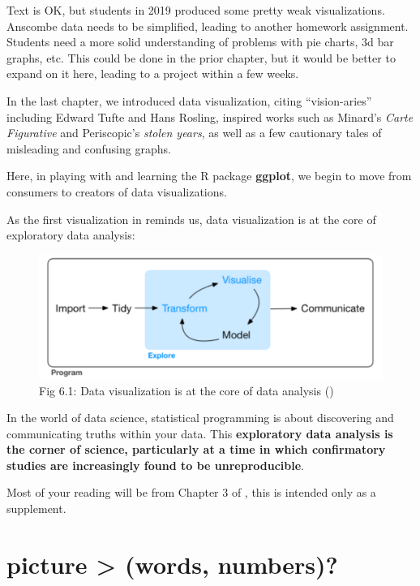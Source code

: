 \documentclass[
  openany]{book}
\begin{document}
Text is OK, but students in 2019 produced some pretty weak visualizations. Anscombe data needs to be simplified, leading to another homework assignment. Students need a more solid understanding of problems with pie charts, 3d bar graphs, etc. This could be done in the prior chapter, but it would be better to expand on it here, leading to a project within a few weeks.

In the last chapter, we introduced data visualization, citing ``vision-aries'' including Edward Tufte and Hans Rosling, inspired works such as Minard's \emph{Carte Figurative} and Periscopic's \emph{stolen years}, as well as a few cautionary tales of misleading and confusing graphs.

Here, in playing with and learning the R package \textbf{ggplot}, we begin to move from consumers to creators of data visualizations.

As the first visualization in \citet{wickham2016r} reminds us, data visualization is at the core of exploratory data analysis:

\begin{figure}
\centering
\includegraphics{dataviscycle.PNG}
\caption{Fig 6.1: Data visualization is at the core of data analysis (\citet{wickham2016r})}
\end{figure}

In the world of data science, statistical programming is about discovering and communicating truths within your data. This \textbf{exploratory data analysis is the corner of science, particularly at a time in which confirmatory studies are increasingly found to be unreproducible}.

Most of your reading will be from Chapter 3 of \citet{wickham2016r}, this is intended only as a supplement.

\hypertarget{picture-words-numbers}{%
\section{picture \textgreater{} (words, numbers)?}\label{picture-words-numbers}}
\end{document}
